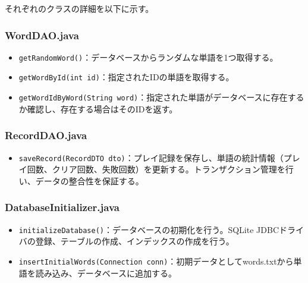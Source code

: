 \documentclass[a4j]{ujarticle}
\begin{document}
それぞれのクラスの詳細を以下に示す。

\subsubsection{WordDAO.java}
\begin{itemize}
  \item \texttt{getRandomWord()}：データベースからランダムな単語を1つ取得する。
  \item \texttt{getWordById(int id)}：指定されたIDの単語を取得する。
  \item \texttt{getWordIdByWord(String word)}：指定された単語がデータベースに存在するか確認し、存在する場合はそのIDを返す。
\end{itemize}

\subsubsection{RecordDAO.java}
\begin{itemize}
  \item \texttt{saveRecord(RecordDTO dto)}：プレイ記録を保存し、単語の統計情報（プレイ回数、クリア回数、失敗回数）を更新する。トランザクション管理を行い、データの整合性を保証する。
\end{itemize}

\subsubsection{DatabaseInitializer.java}
\begin{itemize}
  \item \texttt{initializeDatabase()}：データベースの初期化を行う。SQLite JDBCドライバの登録、テーブルの作成、インデックスの作成を行う。
  \item \texttt{insertInitialWords(Connection conn)}：初期データとしてwords.txtから単語を読み込み、データベースに追加する。
\end{itemize}
\end{document}
